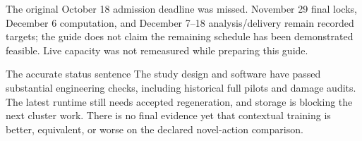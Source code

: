 The original October 18 admission deadline was missed. November 29 final locks,
December 6 computation, and December 7--18 analysis/delivery remain recorded
targets; the guide does not claim the remaining schedule has been demonstrated
feasible. Live capacity was not remeasured while preparing this guide.

\begin{concept}{The accurate status sentence}
The study design and software have passed substantial engineering checks,
including historical full pilots and damage audits. The latest runtime still
needs accepted regeneration, and storage is blocking the next cluster work.
There is no final evidence yet that contextual training is better, equivalent,
or worse on the declared novel-action comparison.
\end{concept}

